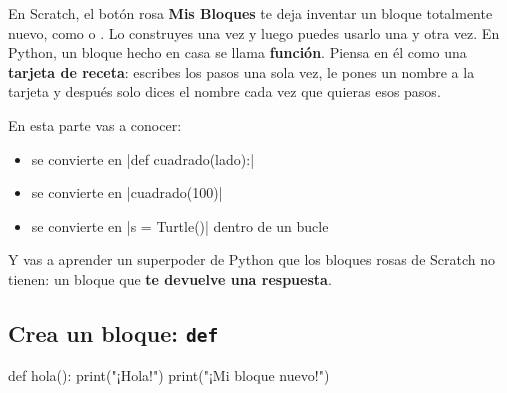 
En Scratch, el botón rosa \textbf{Mis Bloques} te deja inventar un bloque totalmente nuevo, como  o . Lo construyes una vez y luego puedes usarlo una y otra vez. En Python, un bloque hecho en casa se llama \textbf{función}. Piensa en él como una \textbf{tarjeta de receta}: escribes los pasos una sola vez, le pones un nombre a la tarjeta y después solo dices el nombre cada vez que quieras esos pasos.

En esta parte vas a conocer:
\begin{itemize}
  \item {} \quad se convierte en \quad \py|def cuadrado(lado):|
  \item {} \quad se convierte en \quad \py|cuadrado(100)|
  \item {} \quad se convierte en \quad \py|s = Turtle()| dentro de un bucle
\end{itemize}

Y vas a aprender un superpoder de Python que los bloques rosas de Scratch no tienen: un bloque que \textbf{te devuelve una respuesta}.


\subsection*{Crea un bloque: \texttt{def}}

\begin{tcbraster}[raster columns=2, raster equal height=rows, raster column skip=12pt, raster valign=center, raster force size=false, raster column 1/.style={add to width=-2cm}, raster column 2/.style={add to width=2cm}]
\begin{tcolorbox}[colback=white, colframe=white, boxrule=0pt, valign=center]
\begin{scratch}[scale=0.71]
\end{scratch}
\end{tcolorbox}
\begin{code}
def hola():
    print("¡Hola!")
    print("¡Mi bloque nuevo!")
\end{code}
\end{tcbraster}

